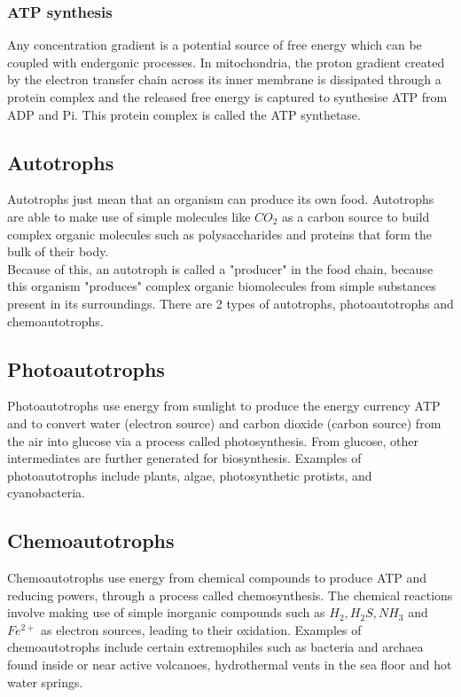\documentclass[11pt]{article}
\begin{document}
\subsubsection{ATP synthesis}
\label{sec:org5966f3c}
Any concentration gradient is a potential source of free energy which can be coupled with endergonic processes. In mitochondria, the proton gradient created by the electron transfer chain across its inner membrane is dissipated through a protein complex and the released free energy is captured to synthesise ATP from ADP and Pi. This protein complex is called the ATP synthetase.

\subsection{Autotrophs}
\label{sec:orga31c38c}
Autotrophs just mean that an organism can produce its own food. Autotrophs are able to make use of simple molecules like \(CO_2\) as a carbon source to build complex organic molecules such as polysaccharides and proteins that form the bulk of their body.
\\[0pt]

Because of this, an autotroph is called a "producer" in the food chain, because this organism "produces" complex organic biomolecules from simple substances present in its surroundings. There are 2 types of autotrophs, photoautotrophs and chemoautotrophs.

\subsection{Photoautotrophs}
\label{sec:org1bae654}
Photoautotrophs use energy from sunlight to produce the energy currency ATP and to convert water (electron source) and carbon dioxide (carbon source) from the air into glucose via a process called photosynthesis. From glucose, other intermediates are further generated for biosynthesis. Examples of photoautotrophs include plants, algae, photosynthetic protists, and cyanobacteria.

\subsection{Chemoautotrophs}
\label{sec:org6f86c83}
Chemoautotrophs use energy from chemical compounds to produce ATP and reducing powers, through a process called chemosynthesis. The chemical reactions involve making use of simple inorganic compounds such as \(H_2, H_2 S, NH_3\) and \(Fe^{2+}\) as electron sources, leading to their oxidation. Examples of chemoautotrophs include certain extremophiles such as bacteria and archaea found inside or near active volcanoes, hydrothermal vents in the sea floor and hot water springs.
\end{document}
